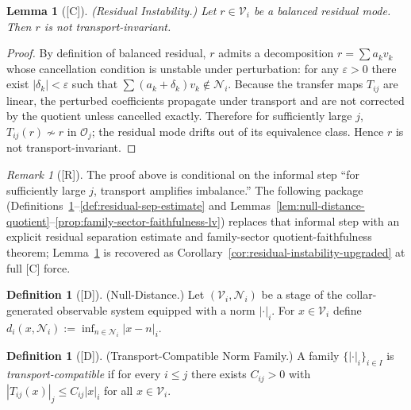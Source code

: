 \documentclass[12pt,oneside]{amsbook}
\theoremstyle{plain}
\newtheorem{lemma}[theorem]{Lemma}
\theoremstyle{definition}
\newtheorem{definition}[theorem]{Definition}
\theoremstyle{remark}
\newtheorem{remark}[theorem]{Remark}
\newcommand{\status}[1]{\textup{[#1]}}
\begin{document}
\begin{lemma}[\status{C}]\label{lem:residual-instability}
\textup{(Residual Instability.)}
Let $r \in \mathcal{V}_i$ be a balanced residual mode.  Then $r$ is
not transport-invariant.
\end{lemma}

\begin{proof}
By definition of balanced residual, $r$ admits a decomposition
$r = \sum a_k v_k$ whose cancellation condition is unstable under
perturbation: for any $\varepsilon > 0$ there exist $|\delta_k| <
\varepsilon$ such that $\sum (a_k + \delta_k) v_k \notin \mathcal{N}_i$.
Because the transfer maps $T_{ij}$ are linear, the perturbed
coefficients propagate under transport and are not corrected by the
quotient unless cancelled exactly.  Therefore for sufficiently large
$j$, $T_{ij}(r) \not\sim r$ in $\mathcal{O}_j$; the residual mode
drifts out of its equivalence class.  Hence $r$ is not transport-invariant.
\end{proof}

\begin{remark}[\status{R}]\label{rem:residual-instability-upgrade}
The proof above is conditional on the informal step ``for sufficiently
large $j$, transport amplifies imbalance.''  The following package
(Definitions~\ref{def:null-distance}--\ref{def:residual-sep-estimate}
and Lemmas~\ref{lem:null-distance-quotient}--\ref{prop:family-sector-faithfulness-lv})
replaces that informal step with an explicit residual separation
estimate and family-sector quotient-faithfulness theorem;
Lemma~\ref{lem:residual-instability} is recovered as
Corollary~\ref{cor:residual-instability-upgraded} at full [C] force.
\end{remark}


\begin{definition}[\status{D}]\label{def:null-distance}
\textup{(Null-Distance.)}
Let $(\mathcal{V}_i, \mathcal{N}_i)$ be a stage of the
collar-generated observable system equipped with a norm $|\cdot|_i$.
For $x \in \mathcal{V}_i$ define
$d_i(x, \mathcal{N}_i) := \inf_{n \in \mathcal{N}_i} |x - n|_i$.
\end{definition}

\begin{definition}[\status{D}]\label{def:transport-compatible-norm}
\textup{(Transport-Compatible Norm Family.)}
A family $\{|\cdot|_i\}_{i \in I}$ is \emph{transport-compatible} if
for every $i \leq j$ there exists $C_{ij}>0$ with
$|T_{ij}(x)|_j \leq C_{ij}|x|_i$ for all $x \in \mathcal{V}_i$.
\end{definition}
\end{document}

